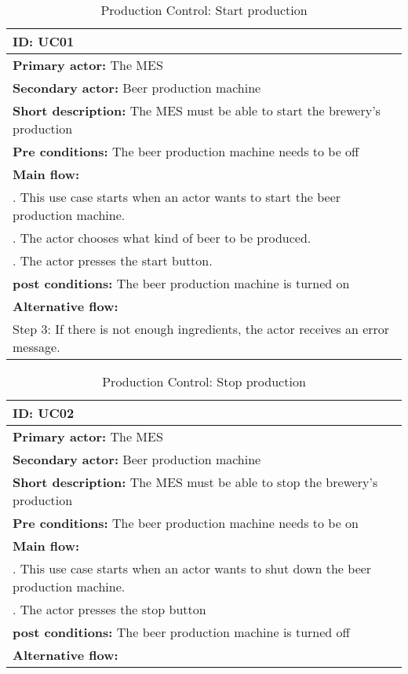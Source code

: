 \begin{table}[ht]
    \begin{tabularx}{\textwidth}{|>{\RaggedRight}X|}
        \hline
        \textbf{ID:} UC01  \\
        \hline
        \textbf{Primary actor:} The MES \\
        \hline
        \textbf{Secondary actor:} Beer production machine \\
        \hline
        \textbf{Short description:} The MES must be able to start the brewery's
        production \\
        \hline
        \textbf{Pre conditions:} The beer production machine needs to be off \\
        \hline
        \textbf{Main flow:} \\
        	1. This use case starts when an actor wants to start the beer
        	production machine. \\
        	2. The actor chooses what kind of beer to be produced. \\
        	3. The actor presses the start button. \\
		\hline
        \textbf{post conditions:} The beer production machine is turned on \\
        \hline
        \textbf{Alternative flow:} \\
        	Step 3: If there is not enough ingredients, the actor receives an
        	error message. \\
        \hline
    \end{tabularx}
    \caption{Production Control: Start production}
    \label{table:usecase_productionStart}
\end{table}

\begin{table}[ht]
    \begin{tabularx}{\textwidth}{|>{\RaggedRight}X|}
        \hline
        \textbf{ID:} UC02  \\
        \hline
        \textbf{Primary actor:} The MES \\
        \hline
        \textbf{Secondary actor:} Beer production machine \\
        \hline
        \textbf{Short description:} The MES must be able to stop the brewery's
        production \\
        \hline
        \textbf{Pre conditions:} The beer production machine needs to be on \\
        \hline
        \textbf{Main flow:} \\
        	1. This use case starts when an actor wants to shut down the beer
        	production machine. \\
			2. The actor presses the stop button \\
		\hline
        \textbf{post conditions:} The beer production machine is turned off \\
        \hline
        \textbf{Alternative flow:} \\
        \hline
    \end{tabularx}
    \caption{Production Control: Stop production} 
    \label{table:usecase_productionStop}
\end{table}

